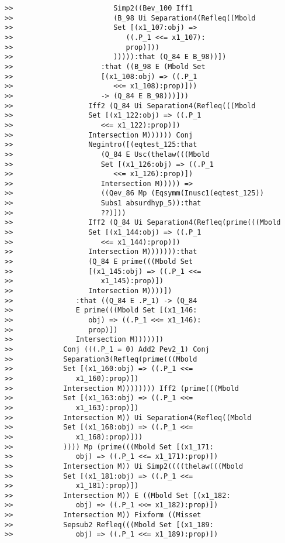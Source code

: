 \documentclass[12pt]{article}
\begin{document}
\begin{verbatim}
>>                        Simp2((Bev_100 Iff1
>>                        (B_98 Ui Separation4(Refleq((Mbold
>>                        Set [(x1_107:obj) =>
>>                           ((.P_1 <<= x1_107):
>>                           prop)]))
>>                        ))))):that (Q_84 E B_98))])
>>                     :that ((B_98 E (Mbold Set
>>                     [(x1_108:obj) => ((.P_1
>>                        <<= x1_108):prop)]))
>>                     -> (Q_84 E B_98)))]))
>>                  Iff2 (Q_84 Ui Separation4(Refleq(((Mbold
>>                  Set [(x1_122:obj) => ((.P_1
>>                     <<= x1_122):prop)])
>>                  Intersection M)))))) Conj
>>                  Negintro([(eqtest_125:that
>>                     (Q_84 E Usc(thelaw(((Mbold
>>                     Set [(x1_126:obj) => ((.P_1
>>                        <<= x1_126):prop)])
>>                     Intersection M))))) =>
>>                     ((Qev_86 Mp (Eqsymm(Inusc1(eqtest_125))
>>                     Subs1 absurdhyp_5)):that
>>                     ??)]))
>>                  Iff2 (Q_84 Ui Separation4(Refleq(prime(((Mbold
>>                  Set [(x1_144:obj) => ((.P_1
>>                     <<= x1_144):prop)])
>>                  Intersection M))))))):that
>>                  (Q_84 E prime(((Mbold Set
>>                  [(x1_145:obj) => ((.P_1 <<=
>>                     x1_145):prop)])
>>                  Intersection M))))])
>>               :that ((Q_84 E .P_1) -> (Q_84
>>               E prime(((Mbold Set [(x1_146:
>>                  obj) => ((.P_1 <<= x1_146):
>>                  prop)])
>>               Intersection M)))))])
>>            Conj (((.P_1 = 0) Add2 Pev2_1) Conj
>>            Separation3(Refleq(prime(((Mbold
>>            Set [(x1_160:obj) => ((.P_1 <<=
>>               x1_160):prop)])
>>            Intersection M)))))))) Iff2 (prime(((Mbold
>>            Set [(x1_163:obj) => ((.P_1 <<=
>>               x1_163):prop)])
>>            Intersection M)) Ui Separation4(Refleq((Mbold
>>            Set [(x1_168:obj) => ((.P_1 <<=
>>               x1_168):prop)]))
>>            )))) Mp (prime(((Mbold Set [(x1_171:
>>               obj) => ((.P_1 <<= x1_171):prop)])
>>            Intersection M)) Ui Simp2((((thelaw(((Mbold
>>            Set [(x1_181:obj) => ((.P_1 <<=
>>               x1_181):prop)])
>>            Intersection M)) E ((Mbold Set [(x1_182:
>>               obj) => ((.P_1 <<= x1_182):prop)])
>>            Intersection M)) Fixform ((Misset
>>            Sepsub2 Refleq(((Mbold Set [(x1_189:
>>               obj) => ((.P_1 <<= x1_189):prop)])

\end{verbatim}
\end{document}
